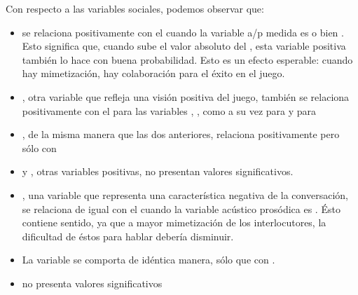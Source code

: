 Con respecto a las variables sociales, podemos observar que:

\begin{itemize}
  \item \svcontributes se relaciona positivamente con el \absentrainment cuando la variable a/p medida es \FOMEAN o bien \NOISETOHARMONICS. Esto significa que, cuando sube el valor absoluto del \entrainment, esta variable positiva también lo hace con buena probabilidad. Esto es un efecto esperable: cuando hay mimetización, hay colaboración para el éxito en el juego.
  \item \svclear, otra variable que refleja una visión positiva del juego, también se relaciona positivamente con el \absentrainment para las variables \FOMEAN, \NOISETOHARMONICS, \ENGMAX como a su vez para \PHONAVG y para \SYLCOUNT
  \item \svengaged, de la misma manera que las dos anteriores, relaciona positivamente pero sólo con \FOMEAN
  \item \svplanning y \svencourages, otras variables positivas, no presentan valores significativos.
  \item \svdifficult, una variable que representa una característica negativa de la conversación, se relaciona de igual con el \absentrainment cuando la variable acústico prosódica es \ENGMAX. Ésto contiene sentido, ya que a mayor mimetización de los interlocutores, la dificultad de éstos para hablar debería disminuir.
  \item La variable \svbored se comporta de idéntica manera, sólo que con \FOMEAN.
  \item \svdislikes no presenta valores significativos
\end{itemize}



